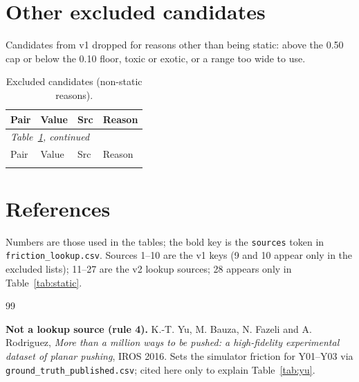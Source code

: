 \documentclass[11pt]{article}
\begin{document}
\section{Other excluded candidates}
Candidates from v1 dropped for reasons other than being static: above the 0.50 cap or below the 0.10 floor, toxic or exotic, or a range too wide to use.

{\footnotesize
\begin{longtable}{p{4.8cm} l l p{8cm}}
\caption{Excluded candidates (non-static reasons).}\label{tab:excluded}\\
\hline
Pair & Value & Src & Reason\\
\hline
\endfirsthead
\multicolumn{4}{l}{\emph{Table~\ref{tab:excluded}, continued}}\\
\hline
Pair & Value & Src & Reason\\
\hline
\endhead
\hline
\endfoot

\end{longtable}
}

\section{References}\label{sec:refs}
Numbers are those used in the tables; the bold key is the \texttt{sources} token in \texttt{friction\_lookup.csv}. Sources 1--10 are the v1 keys (9 and 10 appear only in the excluded lists); 11--27 are the v2 lookup sources; 28 appears only in Table~\ref{tab:static}.
\begingroup
\renewcommand{\section}[2]{}%
\begin{thebibliography}{99}
\raggedright

\end{thebibliography}
\endgroup

\medskip\noindent\textbf{Not a lookup source (rule 4).} K.-T. Yu, M. Bauza, N. Fazeli and A. Rodriguez, \emph{More than a million ways to be pushed: a high-fidelity experimental dataset of planar pushing}, IROS 2016. Sets the simulator friction for Y01--Y03 via \texttt{ground\_truth\_published.csv}; cited here only to explain Table~\ref{tab:yu}.
\end{document}
